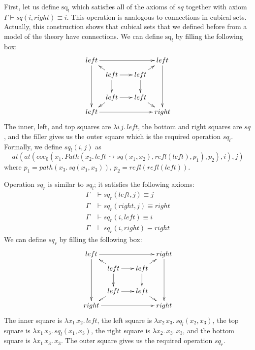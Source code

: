 \documentclass{mscs}
\newcommand{\deq}{\equiv}
\newcommand{\idtype}{\rightsquigarrow}
\newcommand{\sq}{\mathrm{sq}}
\numberwithin{figure}{section}
\begin{document}
First, let us define $\sq_l$ which satisfies all of the axioms of $sq$ together with axiom $\Gamma \vdash sq(i,right) \deq i$.
This operation is analogous to connections in cubical sets.
Actually, this construction shows that cubical sets that we defined before from a model of the theory have connections.
We can define $\sq_l$ by filling the following box:
\[ \xymatrix @C=0.5pc @R=0.5pc
    { left \ar[rrrr] \ar[dddd] &          & &                      & left \ar[dddd] \\
           & left \ar[rr] \ar[dd] \ar[ul] & & left \ar[dd] \ar[ur] & \\
           &                              & &                      & \\
           & left \ar[rr] \ar[dl]         & & left \ar[dr]         & \\
      left \ar[rrrr]           &          & &                      & right
    }\]
The inner, left, and top squares are $\lambda i\,j.\,left$, the bottom and right squares are $sq$,
and the filler gives us the outer square which is the required operation $sq_l$.
Formally, we define $sq_l(i,j)$ as
\[ at(at(coe_0(x_1.\,Path(x_2.\,left \idtype sq(x_1,x_2), refl(left), p_1), p_2),i),j) \]
where $p_1 = path(x_3.\,sq(x_1,x_3))$, $p_2 = refl(refl(left))$.

Operation $sq_r$ is similar to $sq_l$; it satisfies the following axioms:
\begin{align*}
\Gamma & \vdash sq_r(left,j) \deq j \\
\Gamma & \vdash sq_r(right,j) \deq right \\
\Gamma & \vdash sq_r(i,left) \deq i \\
\Gamma & \vdash sq_r(i,right) \deq right
\end{align*}
We can define $sq_r$ by filling the following box:
\[ \xymatrix @C=0.5pc @R=0.5pc
    { left \ar[rrrr] \ar[dddd] &          & &                      & right \ar[dddd] \\
           & left \ar[rr] \ar[dd] \ar[ul] & & left \ar[dd] \ar[ur] & \\
           &                              & &                      & \\
           & left \ar[rr] \ar[dl]         & & left \ar[dr]         & \\
      right \ar[rrrr]           &         & &                      & right
    }\]
The inner square is $\lambda x_1\,x_2.\,left$, the left square is $\lambda x_2\,x_3.\,sq_l(x_2,x_3)$,
the top square is $\lambda x_1\,x_3.\,sq_l(x_1,x_3)$, the right square is $\lambda x_2.\,x_3.\,x_3$,
and the bottom square is $\lambda x_1\,x_3.\,x_3$.
The outer square gives us the required operation $sq_r$.
\end{document}
